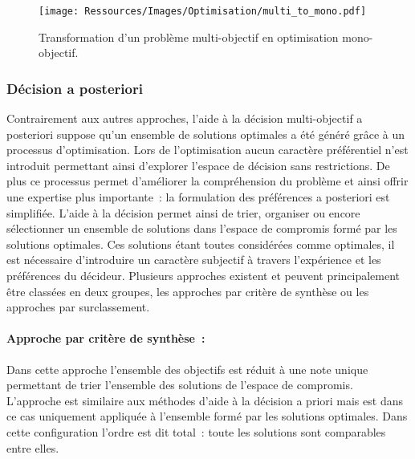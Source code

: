 \begin{figure}
    \centering
    \texttt{[image: Ressources/Images/Optimisation/multi\_to\_mono.pdf]}
    \caption{Transformation d’un problème multi-objectif en optimisation mono-objectif.}
    \label{fig:multi_to_mono}
\end{figure}


\subsubsection{Décision a posteriori} %
\label{ssub:decision_a_posteriori}
Contrairement aux autres approches, l’aide à la décision multi-objectif a posteriori
suppose qu’un ensemble de solutions optimales a été généré grâce à un processus
d’optimisation. Lors de l’optimisation aucun caractère préférentiel
n’est introduit permettant ainsi d’explorer l’espace de décision sans restrictions.
De plus ce processus permet d’améliorer la compréhension du problème et ainsi
offrir une expertise plus importante~: la formulation des préférences a posteriori
est simplifiée.
L’aide à la décision permet ainsi de trier, organiser ou encore sélectionner un
ensemble de solutions dans l’espace de compromis formé par les solutions optimales.
Ces solutions étant toutes considérées comme optimales, il est nécessaire d’introduire
un caractère subjectif à travers l’expérience et les préférences du décideur.
Plusieurs approches existent et peuvent principalement être classées en deux groupes,
les approches par critère de synthèse ou les approches par surclassement.


\paragraph{Approche par critère de synthèse~:} %
\label{par:approche_par_critère_de_synthèse}
Dans cette approche l’ensemble des objectifs est réduit à une note unique permettant
de trier l’ensemble des solutions de l’espace de compromis.
L’approche est similaire aux méthodes d’aide à la décision a priori mais est dans
ce cas uniquement appliquée à l’ensemble formé par les solutions optimales. Dans cette
configuration l’ordre est dit total~: toute les solutions sont comparables entre elles.

